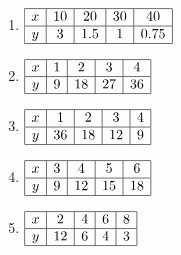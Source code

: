 \begin{multicols}{2}
\begin{enumerate}[noitemsep, label = \color{blue}\arabic*. ]
    \item 
    $
    \begin{array}{|c|c|c|c|c|}
        \hline
        x & 10 & 20 & 30 & 40 \\ \hline
        y & 3 & 1.5 & 1 & 0.75 \\ \hline
    \end{array}
    $
    
    \item 
    $
    \begin{array}{|c|c|c|c|c|}
        \hline
        x & 1 & 2 & 3 & 4 \\ \hline
        y & 9 & 18 & 27 & 36 \\ \hline
    \end{array}
    $
    
    \item 
    $
    \begin{array}{|c|c|c|c|c|}
        \hline
        x & 1 & 2 & 3 & 4 \\ \hline
        y & 36 & 18 & 12 & 9 \\ \hline
    \end{array}
    $
    
    \item 
    $
    \begin{array}{|c|c|c|c|c|}
        \hline
        x & 3 & 4 & 5 & 6 \\ \hline
        y & 9 & 12 & 15 & 18 \\ \hline
    \end{array}
    $
    
    \item 
    $
    \begin{array}{|c|c|c|c|c|}
        \hline
        x & 2 & 4 & 6 & 8 \\ \hline
        y & 12 & 6 & 4 & 3 \\ \hline
    \end{array}
    $
    
\end{enumerate}
\end{multicols}

				
				
